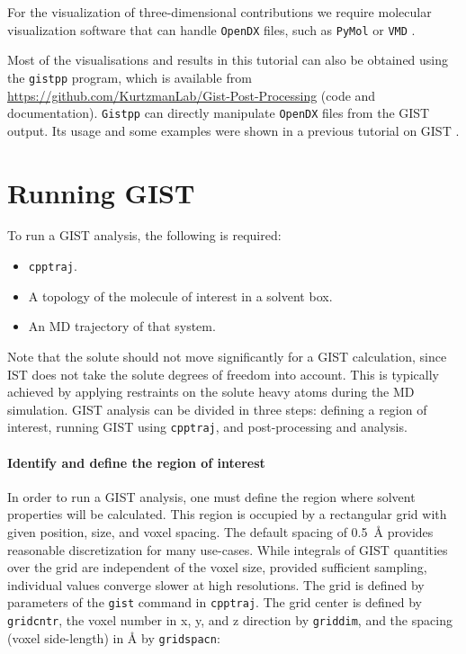 \documentclass[9pt,tutorial]{livecoms}
\newcommand{\software}{\texttt}
\newcommand\inlinecode{\texttt}
\begin{document}
For the visualization of three-dimensional contributions we require molecular visualization software that can handle \software{OpenDX} files, such as \software{PyMol} \cite{pymol} or \software{VMD} \cite{vmd}.

Most of the visualisations and results in this tutorial can also be obtained using the \software{gistpp} program, which is available from \url{https://github.com/KurtzmanLab/Gist-Post-Processing} (code and documentation). \software{Gistpp} can directly manipulate \software{OpenDX} files from the GIST output. 
Its usage and some examples were shown in a previous tutorial on GIST \cite{Ramsey2016}.

\section{Running GIST}
\label{sec:running_GIST}
To run a GIST analysis, the following is required:
\begin{itemize}
	\item \software{cpptraj}.
	\item A topology of the molecule of interest in a solvent box.
	\item An MD trajectory of that system.
\end{itemize}
Note that the solute should not move significantly for a GIST calculation, since IST does not take the solute degrees of freedom into account.
This is typically achieved by applying restraints on the solute heavy atoms during the MD simulation.
GIST analysis can be divided in three steps: defining a region of interest, running GIST using \software{cpptraj}, and post-processing and analysis.
\cite{Ramsey2016}

\paragraph{Identify and define the region of interest}
In order to run a GIST analysis, one must define the region where solvent properties will be calculated.
This region is occupied by a rectangular grid with given position, size, and voxel spacing.
The default spacing of \SI{0.5}{\angstrom} provides reasonable discretization for many use-cases.
While integrals of GIST quantities over the grid are independent of the voxel size, provided sufficient sampling, individual values converge slower at high resolutions.
The grid is defined by parameters of the \inlinecode{gist} command in \software{cpptraj}.
The grid center is defined by \inlinecode{gridcntr}, the voxel number in x, y, and z direction by \inlinecode{griddim}, and the spacing (voxel side-length) in \AA{} by \inlinecode{gridspacn}:
\end{document}
